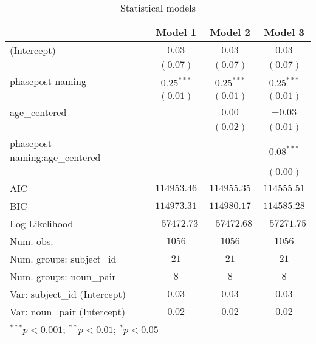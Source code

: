 
\begin{table}
\begin{center}
\begin{tabular}{l c c c}
\hline
 & Model 1 & Model 2 & Model 3 \\
\hline
(Intercept)                    & $0.03$       & $0.03$       & $0.03$       \\
                               & $(0.07)$     & $(0.07)$     & $(0.07)$     \\
phasepost-naming               & $0.25^{***}$ & $0.25^{***}$ & $0.25^{***}$ \\
                               & $(0.01)$     & $(0.01)$     & $(0.01)$     \\
age\_centered                  &              & $0.00$       & $-0.03$      \\
                               &              & $(0.02)$     & $(0.01)$     \\
phasepost-naming:age\_centered &              &              & $0.08^{***}$ \\
                               &              &              & $(0.00)$     \\
\hline
AIC                            & $114953.46$  & $114955.35$  & $114555.51$  \\
BIC                            & $114973.31$  & $114980.17$  & $114585.28$  \\
Log Likelihood                 & $-57472.73$  & $-57472.68$  & $-57271.75$  \\
Num. obs.                      & $1056$       & $1056$       & $1056$       \\
Num. groups: subject\_id       & $21$         & $21$         & $21$         \\
Num. groups: noun\_pair        & $8$          & $8$          & $8$          \\
Var: subject\_id (Intercept)   & $0.03$       & $0.03$       & $0.03$       \\
Var: noun\_pair (Intercept)    & $0.02$       & $0.02$       & $0.02$       \\
\hline
\multicolumn{4}{l}{\scriptsize{$^{***}p<0.001$; $^{**}p<0.01$; $^{*}p<0.05$}}
\end{tabular}
\caption{Statistical models}
\label{table:coefficients}
\end{center}
\end{table}

